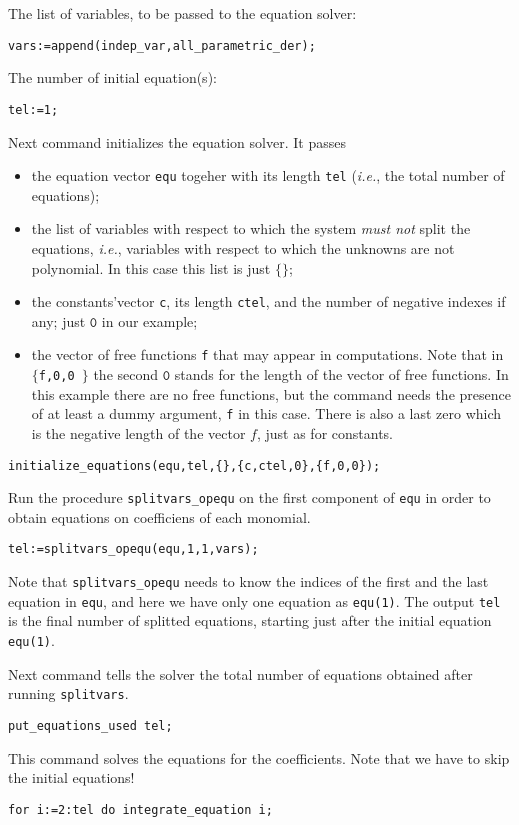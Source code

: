 The list of variables, to be passed to the equation solver:
\begin{verbatim}
vars:=append(indep_var,all_parametric_der);
\end{verbatim}
The number of initial equation(s):
\begin{verbatim}
tel:=1;
\end{verbatim}
Next command initializes the equation solver.  It passes
\begin{itemize}
  \item the equation vector \texttt{equ} togeher with its length \texttt{tel}
    (\emph{i.e.}, the total number of equations);
  \item the list of variables with respect to which the system \emph{must not}
    split the equations, \emph{i.e.}, variables with respect to which the
    unknowns are not polynomial. In this case this list is just $\{\}$;
  \item the constants'vector \texttt{c}, its length \texttt{ctel}, and the
    number of negative indexes if any; just $\texttt{0}$ in our example;
  \item the vector of free functions \texttt{f} that may appear in
    computations. Note that in \texttt{$\{$f,0,0 $\}$} the second $\texttt{0}$
    stands for the length of the vector of free functions. In this example
    there are no free functions, but the command needs the presence of at least
    a dummy argument, \texttt{f} in this case. There is also a last zero which
    is the negative length of the vector $f$, just as for constants.
  \end{itemize}
\begin{verbatim}
initialize_equations(equ,tel,{},{c,ctel,0},{f,0,0});
\end{verbatim}
Run the procedure \texttt{splitvars\_opequ} on the first component of
\texttt{equ} in order to obtain equations on coefficiens of each monomial.
\begin{verbatim}
tel:=splitvars_opequ(equ,1,1,vars);
\end{verbatim}
Note that \texttt{splitvars\_opequ} needs to know the indices of the first and
the last equation in \texttt{equ}, and here we have only one equation as
\texttt{equ(1)}. The output \texttt{tel} is the final number of splitted
equations, starting just after the initial equation \texttt{equ(1)}.

Next command tells the solver the total number of equations obtained
after running \texttt{splitvars}.
\begin{verbatim}
put_equations_used tel;
\end{verbatim}
This command solves the equations for the coefficients.
Note that we have to skip the initial equations!
\begin{verbatim}
for i:=2:tel do integrate_equation i;
\end{verbatim}

